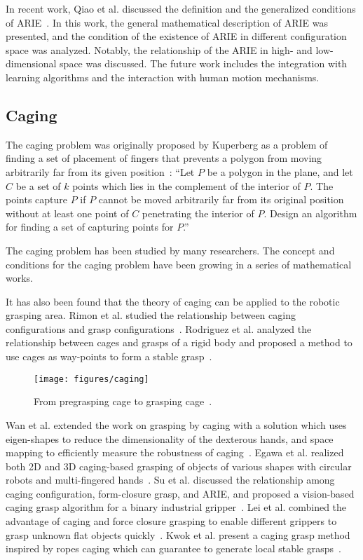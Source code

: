 \documentclass[journal,twoside,web]{ieeecolor}
\begin{document}
In recent work, Qiao et al. discussed the definition and the generalized conditions of ARIE~\cite{Qiao2015}. In this work, the general mathematical description of ARIE was presented, and the condition of the existence of ARIE in different configuration space was analyzed. Notably, the relationship of the ARIE in high- and low-dimensional space was discussed. The future work includes the integration with learning algorithms and the interaction with human motion mechanisms.


\subsection{Caging}
\label{subsec:caging}

The caging problem was originally proposed by Kuperberg as a problem of finding a set of placement of fingers that prevents a polygon from moving arbitrarily far from its given position~\cite{kuperberg1990problems}:
``Let $P$ be a polygon in the plane, and let $C$ be a set of $k$ points which lies in the complement of the interior of $P$. The points capture $P$ if $P$ cannot be moved arbitrarily far from its original position without at least one point of $C$ penetrating the interior of $P$. Design an algorithm for finding a set of capturing points for $P$.''

The caging problem has been studied by many researchers. The concept and conditions for the caging problem have been growing in a series of mathematical works. 

It has also been found that the theory of caging can be applied to the robotic grasping area. 
Rimon et al. studied the relationship between caging configurations and grasp configurations~\cite{Rimon1999}. 
Rodriguez et al. analyzed the relationship between cages and grasps of a rigid body and proposed a method to use cages as way-points to form a stable grasp~\cite{Rodriguez2012b}. 
\begin{figure}[htbp]
    \centering
    \texttt{[image: figures/caging]}
    \caption{From pregrasping cage to grasping cage~\cite{Rodriguez2012b}.}
    \label{fig:caging}
\end{figure}
Wan et al. extended the work on grasping by caging with a solution which uses eigen-shapes to reduce the dimensionality of the dexterous hands, and space mapping to efficiently measure the robustness of caging~\cite{Wan2013}.
Egawa et al. realized both 2D and 3D caging-based grasping of objects of various shapes with circular robots and multi-fingered hands~\cite{Egawa2015}.
Su et al. discussed the relationship among caging configuration, form-closure grasp, and ARIE, and proposed a vision-based caging grasp algorithm for a binary industrial gripper~\cite{Su2015a,Su2015b,Su2017}.
Lei et al. combined the advantage of caging and force closure grasping to enable different grippers to grasp unknown flat objects quickly~\cite{Lei2016}.
Kwok et al. present a caging grasp method inspired by ropes caging which can guarantee to generate local stable grasps~\cite{Kwok2016}.
\end{document}
